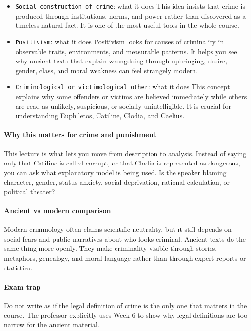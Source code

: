 \documentclass[11pt]{article}
\begin{document}
\begin{itemize}
\item \texttt{Social construction of crime}: what it does This idea insists that crime is produced through institutions, norms, and power rather than discovered as a timeless natural fact. It is one of the most useful tools in the whole course.
\item \texttt{Positivism}: what it does Positivism looks for causes of criminality in observable traits, environments, and measurable patterns. It helps you see why ancient texts that explain wrongdoing through upbringing, desire, gender, class, and moral weakness can feel strangely modern.
\item \texttt{Criminological or victimological other}: what it does This concept explains why some offenders or victims are believed immediately while others are read as unlikely, suspicious, or socially unintelligible. It is crucial for understanding Euphiletos, Catiline, Clodia, and Caelius.
\end{itemize}

\paragraph{Why this matters for crime and punishment}

This lecture is what lets you move from description to analysis. Instead of saying only that Catiline is called corrupt, or that Clodia is represented as dangerous, you can ask what explanatory model is being used. Is the speaker blaming character, gender, status anxiety, social deprivation, rational calculation, or political theater?

\paragraph{Ancient vs modern comparison}

Modern criminology often claims scientific neutrality, but it still depends on social fears and public narratives about who looks criminal. Ancient texts do the same thing more openly. They make criminality visible through stories, metaphors, genealogy, and moral language rather than through expert reports or statistics.

\paragraph{Exam trap}

Do not write as if the legal definition of crime is the only one that matters in the course. The professor explicitly uses Week 6 to show why legal definitions are too narrow for the ancient material.
\end{document}
